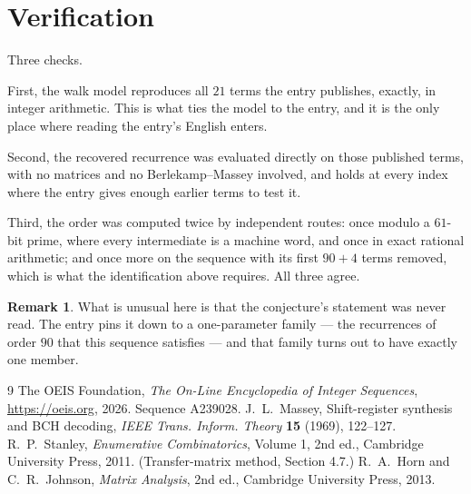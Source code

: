 \documentclass[11pt,a4paper]{article}
\theoremstyle{plain}
\theoremstyle{definition}
\newtheorem{remark}[theorem]{Remark}
\begin{document}
\section{Verification}

Three checks.

First, the walk model reproduces all $21$ terms the entry publishes, exactly, in integer
arithmetic. This is what ties the model to the entry, and it is the only place where reading
the entry's English enters.

Second, the recovered recurrence was evaluated directly on those published terms, with no
matrices and no Berlekamp--Massey involved, and holds at every index where the entry gives
enough earlier terms to test it.

Third, the order was computed twice by independent routes: once modulo a $61$-bit prime, where
every intermediate is a machine word, and once in exact rational arithmetic; and once more on
the sequence with its first $90+4$ terms removed, which is what the identification above
requires. All three agree.

\begin{remark}
What is unusual here is that the conjecture's statement was never read. The entry pins it down
to a one-parameter family --- the recurrences of order $90$ that this sequence satisfies
--- and that family turns out to have exactly one member.
\end{remark}

\begin{thebibliography}{9}
 The OEIS Foundation, \emph{The On-Line Encyclopedia of Integer
Sequences}, \url{https://oeis.org}, 2026. Sequence A239028.
 J.~L.~Massey, Shift-register synthesis and BCH decoding, \emph{IEEE
Trans. Inform. Theory} \textbf{15} (1969), 122--127.
 R.~P.~Stanley, \emph{Enumerative Combinatorics}, Volume 1, 2nd ed.,
Cambridge University Press, 2011. (Transfer-matrix method, Section 4.7.)
 R.~A.~Horn and C.~R.~Johnson, \emph{Matrix Analysis}, 2nd ed., Cambridge
University Press, 2013.
\end{thebibliography}
\end{document}
